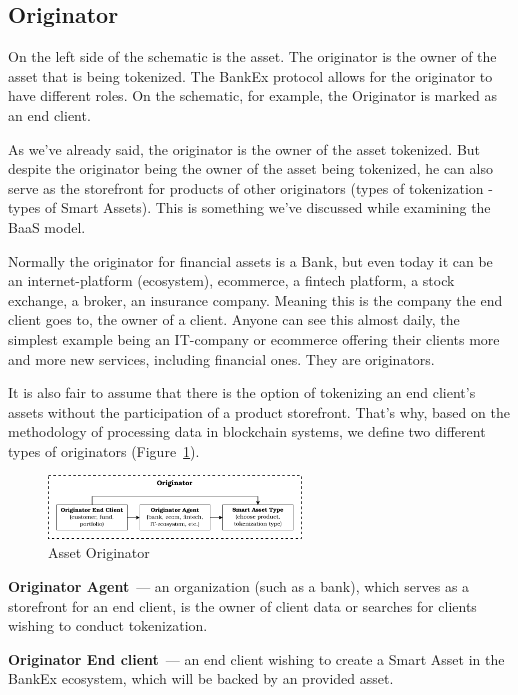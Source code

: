 \documentclass{article}
\begin{document}
\begin{multicols}{2}
\subsection{Originator}

On the left side of the schematic is the asset. The originator is the owner of the asset that is being tokenized. The BankEx protocol allows for the originator to have different roles. On the schematic, for example, the Originator is marked as an end client.

As we've already said, the originator is the owner of the asset tokenized. But despite the originator being the owner of the asset being tokenized, he can also serve as the storefront for products of other originators (types of tokenization - types of Smart Assets). This is something we’ve discussed while examining the BaaS model.

Normally the originator for financial assets is a Bank, but even today it can be an internet-platform (ecosystem), ecommerce, a fintech platform, a stock exchange, a broker, an insurance company. Meaning this is the company the end client goes to, the owner of a client. Anyone can see this almost daily, the simplest example being an IT-company or ecommerce offering their clients more and more new services, including financial ones. They are originators.

It is also fair to assume that there is the option of tokenizing an end client’s assets without the participation of a product storefront. That's why, based on the methodology of processing data in blockchain systems, we define two different types of originators (Figure~\ref{fig:originator}).

\begin{figure}
  \centering
  \includegraphics[width=0.6\textwidth]{originator.pdf}
  \caption{Asset Originator}
  \label{fig:originator}
\end{figure}

\textbf{Originator Agent}~--- an organization (such as a bank), which serves as a storefront for an end client, is the owner of client data or searches for clients wishing to conduct tokenization.

\textbf{Originator End client}~--- an end client wishing to create a Smart Asset in the BankEx ecosystem, which will be backed by an provided asset.


\end{multicols}
\end{document}

